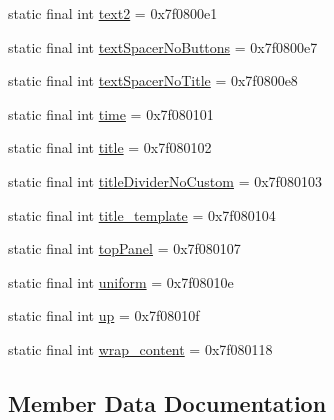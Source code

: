 \begin{DoxyCompactItemize}
\item 
static final int \mbox{\hyperlink{classandroid_1_1support_1_1v7_1_1appcompat_1_1R_1_1id_ab9390bfca9faaba1e8692b82040e152d}{text2}} = 0x7f0800e1
\item 
static final int \mbox{\hyperlink{classandroid_1_1support_1_1v7_1_1appcompat_1_1R_1_1id_a8ea861bc6460b6ef63f07beabc5cb74e}{text\+Spacer\+No\+Buttons}} = 0x7f0800e7
\item 
static final int \mbox{\hyperlink{classandroid_1_1support_1_1v7_1_1appcompat_1_1R_1_1id_a65a1b7cb9dae5e4f54980d2dd6dc3e38}{text\+Spacer\+No\+Title}} = 0x7f0800e8
\item 
static final int \mbox{\hyperlink{classandroid_1_1support_1_1v7_1_1appcompat_1_1R_1_1id_ae0962952dcceb61085f705f21bb7929c}{time}} = 0x7f080101
\item 
static final int \mbox{\hyperlink{classandroid_1_1support_1_1v7_1_1appcompat_1_1R_1_1id_a6c5ab3c0af64adc83824ccd5a9619c44}{title}} = 0x7f080102
\item 
static final int \mbox{\hyperlink{classandroid_1_1support_1_1v7_1_1appcompat_1_1R_1_1id_a9f52841478efd3906465f2ff95e2a5f0}{title\+Divider\+No\+Custom}} = 0x7f080103
\item 
static final int \mbox{\hyperlink{classandroid_1_1support_1_1v7_1_1appcompat_1_1R_1_1id_ad1a2ef4de6c56ea12952f3dcb5583365}{title\+\_\+template}} = 0x7f080104
\item 
static final int \mbox{\hyperlink{classandroid_1_1support_1_1v7_1_1appcompat_1_1R_1_1id_a74344a9a6654c3e1e9647b9e800f3535}{top\+Panel}} = 0x7f080107
\item 
static final int \mbox{\hyperlink{classandroid_1_1support_1_1v7_1_1appcompat_1_1R_1_1id_a18c3191610b9d0a8da3eadc047cc9a6d}{uniform}} = 0x7f08010e
\item 
static final int \mbox{\hyperlink{classandroid_1_1support_1_1v7_1_1appcompat_1_1R_1_1id_a9aab36bc7e4cb601c12167a3b78ed738}{up}} = 0x7f08010f
\item 
static final int \mbox{\hyperlink{classandroid_1_1support_1_1v7_1_1appcompat_1_1R_1_1id_a5263ea8cbb699c84a7171895a696e0c1}{wrap\+\_\+content}} = 0x7f080118
\end{DoxyCompactItemize}


\subsection{Member Data Documentation}
\mbox{\label{classandroid_1_1support_1_1v7_1_1appcompat_1_1R_1_1id_a2c658ecf3cb7a212407850bf58715caa}} 
